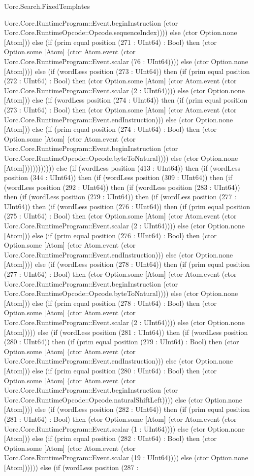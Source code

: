 \begin{lexlean}{Uorc.Search.FixedTemplates}
\begin{semanticmodule}
{Uorc.Core.RuntimeProgram::Event.beginInstruction (ctor Uorc.Core.RuntimeOpcode::Opcode.sequenceIndex)))) else (ctor Option.none [Atom])) else (if (prim equal position (271 : UInt64) : Bool) then (ctor Option.some [Atom] (ctor Atom.event (ctor Uorc.Core.RuntimeProgram::Event.scalar (76 : UInt64)))) else (ctor Option.none [Atom]))) else (if (wordLess position (273 : UInt64)) then (if (prim equal position (272 : UInt64) : Bool) then (ctor Option.some [Atom] (ctor Atom.event (ctor Uorc.Core.RuntimeProgram::Event.scalar (2 : UInt64)))) else (ctor Option.none [Atom])) else (if (wordLess position (274 : UInt64)) then (if (prim equal position (273 : UInt64) : Bool) then (ctor Option.some [Atom] (ctor Atom.event (ctor Uorc.Core.RuntimeProgram::Event.endInstruction))) else (ctor Option.none [Atom])) else (if (prim equal position (274 : UInt64) : Bool) then (ctor Option.some [Atom] (ctor Atom.event (ctor Uorc.Core.RuntimeProgram::Event.beginInstruction (ctor Uorc.Core.RuntimeOpcode::Opcode.byteToNatural)))) else (ctor Option.none [Atom]))))))))))) else (if (wordLess position (413 : UInt64)) then (if (wordLess position (344 : UInt64)) then (if (wordLess position (309 : UInt64)) then (if (wordLess position (292 : UInt64)) then (if (wordLess position (283 : UInt64)) then (if (wordLess position (279 : UInt64)) then (if (wordLess position (277 : UInt64)) then (if (wordLess position (276 : UInt64)) then (if (prim equal position (275 : UInt64) : Bool) then (ctor Option.some [Atom] (ctor Atom.event (ctor Uorc.Core.RuntimeProgram::Event.scalar (2 : UInt64)))) else (ctor Option.none [Atom])) else (if (prim equal position (276 : UInt64) : Bool) then (ctor Option.some [Atom] (ctor Atom.event (ctor Uorc.Core.RuntimeProgram::Event.endInstruction))) else (ctor Option.none [Atom]))) else (if (wordLess position (278 : UInt64)) then (if (prim equal position (277 : UInt64) : Bool) then (ctor Option.some [Atom] (ctor Atom.event (ctor Uorc.Core.RuntimeProgram::Event.beginInstruction (ctor Uorc.Core.RuntimeOpcode::Opcode.byteToNatural)))) else (ctor Option.none [Atom])) else (if (prim equal position (278 : UInt64) : Bool) then (ctor Option.some [Atom] (ctor Atom.event (ctor Uorc.Core.RuntimeProgram::Event.scalar (2 : UInt64)))) else (ctor Option.none [Atom])))) else (if (wordLess position (281 : UInt64)) then (if (wordLess position (280 : UInt64)) then (if (prim equal position (279 : UInt64) : Bool) then (ctor Option.some [Atom] (ctor Atom.event (ctor Uorc.Core.RuntimeProgram::Event.endInstruction))) else (ctor Option.none [Atom])) else (if (prim equal position (280 : UInt64) : Bool) then (ctor Option.some [Atom] (ctor Atom.event (ctor Uorc.Core.RuntimeProgram::Event.beginInstruction (ctor Uorc.Core.RuntimeOpcode::Opcode.naturalShiftLeft)))) else (ctor Option.none [Atom]))) else (if (wordLess position (282 : UInt64)) then (if (prim equal position (281 : UInt64) : Bool) then (ctor Option.some [Atom] (ctor Atom.event (ctor Uorc.Core.RuntimeProgram::Event.scalar (1 : UInt64)))) else (ctor Option.none [Atom])) else (if (prim equal position (282 : UInt64) : Bool) then (ctor Option.some [Atom] (ctor Atom.event (ctor Uorc.Core.RuntimeProgram::Event.scalar (19 : UInt64)))) else (ctor Option.none [Atom]))))) else (if (wordLess position (287 : }
\end{semanticmodule}
\end{lexlean}
